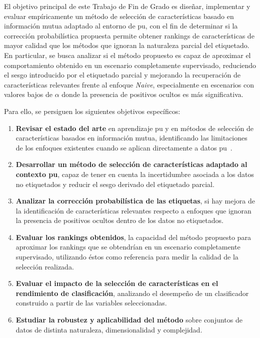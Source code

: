 El objetivo principal de este Trabajo de Fin de Grado es diseñar, implementar y evaluar empíricamente un método de selección de características basado en información mutua adaptado al entorno de \acrshort{pu}, con el fin de determinar si la corrección probabilística propuesta permite obtener rankings de características de mayor calidad que los métodos que ignoran la naturaleza parcial del etiquetado. En particular, se busca analizar si el método propuesto es capaz de aproximar el comportamiento obtenido en un escenario completamente supervisado, reduciendo el sesgo introducido por el etiquetado parcial y mejorando la recuperación de características relevantes frente al enfoque \textit{Naive}, especialmente en escenarios con valores bajos de $\alpha$ donde la presencia de positivos ocultos es más significativa.

Para ello, se persiguen los siguientes objetivos específicos:

\begin{enumerate}

\item \textbf{Revisar el estado del arte} en aprendizaje \acrshort{pu} y en métodos de selección de características basados en información mutua, identificando las limitaciones de los enfoques existentes cuando se aplican directamente a datos \acrshort{pu}~\cite{bekker2020learning,li2003learning,peng2005feature}.

\item \textbf{Desarrollar un método de selección de características adaptado al contexto \acrshort{pu}}, capaz de tener en cuenta la incertidumbre asociada a los datos no etiquetados y reducir el sesgo derivado del etiquetado parcial.

\item \textbf{Analizar la corrección probabilística de las etiquetas}, si hay mejora de la identificación de características relevantes respecto a enfoques que ignoran la presencia de positivos ocultos dentro de los datos no etiquetados.

\item \textbf{Evaluar los rankings obtenidos}, la capacidad del método propuesto para aproximar los rankings que se obtendrían en un escenario completamente supervisado, utilizando éstos como referencia para medir la calidad de la selección realizada.


\item \textbf{Evaluar el impacto de la selección de características en el rendimiento de clasificación}, analizando el desempeño de un clasificador construido a partir de las variables seleccionadas.

\item \textbf{Estudiar la robustez y aplicabilidad del método} sobre conjuntos de datos de distinta naturaleza, dimensionalidad y complejidad.
\end{enumerate}


